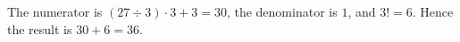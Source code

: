 The numerator is $(27\div3)\cdot3+3=30$, the denominator is $1$, and $3!=6$. Hence the result is $30+6=\boxed{36}$.
